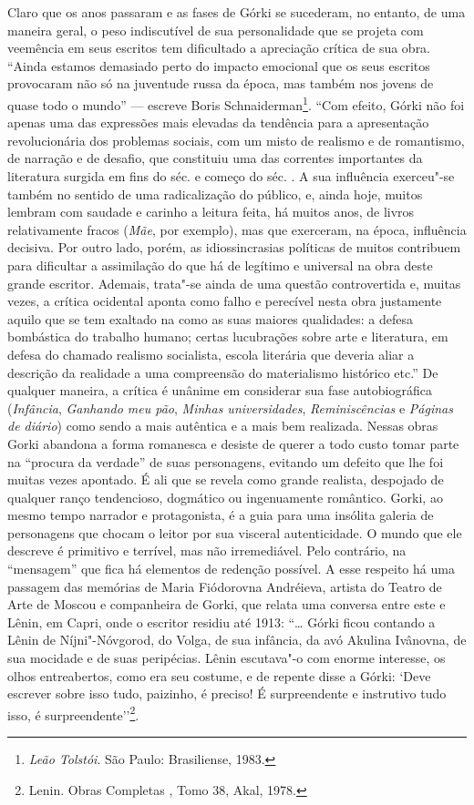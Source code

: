 Claro que os anos passaram e as fases de Górki se sucederam, no entanto,
de uma maneira geral, o peso indiscutível de sua personalidade que se
projeta com veemência em seus escritos tem dificultado a apreciação
crítica de sua obra. ``Ainda estamos demasiado perto do impacto
emocional que os seus escritos provocaram não só na juventude russa da
época, mas também nos jovens de quase todo o mundo'' --- escreve Boris
Schnaiderman\footnote{\emph{Leão Tolstói}. São Paulo: Brasiliense, 1983.}. ``Com efeito, Górki não foi apenas uma das expressões
mais elevadas da tendência para a apresentação revolucionária dos
problemas sociais, com um misto de realismo e de romantismo, de narração
e de desafio, que constituiu uma das correntes importantes da literatura
surgida em fins do séc.  e começo do séc. . A sua influência
exerceu"-se também no sentido de uma radicalização do público, e, ainda
hoje, muitos lembram com saudade e carinho a leitura feita, há muitos
anos, de livros relativamente fracos (\emph{Mãe}, por exemplo), mas que
exerceram, na época, influência decisiva. Por outro lado, porém, as
idiossincrasias políticas de muitos contribuem para dificultar a
assimilação do que há de legítimo e universal na obra deste grande
escritor. Ademais, trata"-se ainda de uma questão controvertida e,
muitas vezes, a crítica ocidental aponta como falho e perecível nesta
obra justamente aquilo que se tem exaltado na  como as suas maiores
qualidades: a defesa bombástica do trabalho humano; certas lucubrações
sobre arte e literatura, em defesa do chamado realismo socialista,
escola literária que deveria aliar a descrição da realidade a uma
compreensão do materialismo histórico etc.'' De qualquer maneira, a
crítica é unânime em considerar sua fase autobiográfica
(\emph{Infância}, \emph{Ganhando meu pão}, \emph{Minhas universidades},
\emph{Reminiscências} e \emph{Páginas de diário}) como sendo a mais
autêntica e a mais bem realizada. Nessas obras Gorki abandona a forma
romanesca e desiste de querer a todo custo tomar parte na ``procura da
verdade'' de suas personagens, evitando um defeito que lhe foi muitas
vezes apontado. É ali que se revela como grande realista, despojado de
qualquer ranço tendencioso, dogmático ou ingenuamente romântico. Gorki,
ao mesmo tempo narrador e protagonista, é a guia para uma insólita
galeria de personagens que chocam o leitor por sua visceral
autenticidade. O mundo que ele descreve é primitivo e terrível, mas não
irremediável. Pelo contrário, na ``mensagem'' que fica há elementos de
redenção possível. A esse respeito há uma passagem das memórias de Maria
Fiódorovna Andréieva, artista do Teatro de Arte de Moscou e companheira
de Gorki, que relata uma conversa entre este e Lênin, em Capri, onde o
escritor residiu até 1913: ``\ldots{} Górki ficou contando a Lênin de
Níjni"-Nóvgorod, do Volga, de sua infância, da avó Akulina Ivânovna, de
sua mocidade e de suas peripécias. Lênin escutava"-o com enorme
interesse, os olhos entreabertos, como era seu costume, e de repente
disse a Górki: ‘Deve escrever sobre isso tudo, paizinho, é preciso! É
surpreendente e instrutivo tudo isso, é surpreendente’'\footnote{Lenin. Obras
  Completas , Tomo 38, Akal, 1978.}.

